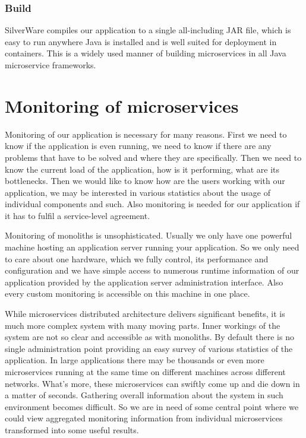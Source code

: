 \documentclass[12pt,oneside]{fithesis2}
\begin{document}
\subsection{Build}
SilverWare compiles our application to a single all-including JAR file, which is easy to run anywhere Java is installed and is well suited for deployment in containers. This is a widely used manner of building microservices in all Java microservice frameworks.

\chapter{Monitoring of microservices}

Monitoring of our application is necessary for many reasons. First we need to know if the application is even running, we need to know if there are any problems that have to be solved and where they are specifically. Then we need to know the current load of the application, how is it performing, what are its bottlenecks. Then we would like to know how are the users working with our application, we may be interested in various statistics about the usage of individual components and such. Also monitoring is needed for our application if it has to fulfil a service-level agreement.

Monitoring of monoliths is unsophisticated. Usually we only have one powerful machine hosting an application server running your application. So we only need to care about one hardware, which we fully control, its performance and configuration and we have simple access to numerous runtime information of our application provided by the application server administration interface. Also every custom monitoring is accessible on this machine in one place.

While microservices distributed architecture delivers significant benefits, it is much more complex system with many moving parts. Inner workings of the system are not so clear and accessible as with monoliths. By default there is no single administration point providing an easy survey of various statistics of the application. In large applications there may be thousands or even more microservices running at the same time on different machines across different networks. What's more, these microservices can swiftly come up and die down in a matter of seconds. Gathering overall information about the system in such environment becomes difficult. So we are in need of some central point where we could view aggregated monitoring information from individual microservices transformed into some useful results.
\end{document}
